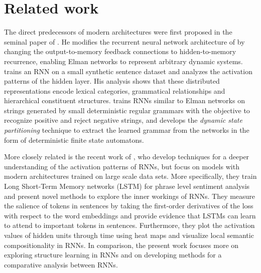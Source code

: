 \section{Related work}
\label{sec:related}

The direct predecessors of modern architectures were first proposed in the 
seminal paper of . He modifies the recurrent 
neural network architecture of  by changing the output-to-memory 
feedback connections to hidden-to-memory recurrence, enabling Elman networks to 
represent arbitrary dynamic systems.  trains an RNN on a small synthetic
sentence  dataset and analyzes the activation patterns of the hidden
layer. His analysis shows that these distributed representations  
encode lexical categories, grammatical relationships and hierarchical constituent 
structures.  trains RNNs similar to Elman
networks on strings generated by small 
deterministic regular grammars with the objective to recognize positive and reject negative 
strings, and develops the \emph{dynamic state partitioning} technique to extract the learned 
grammar from the networks in the form of deterministic finite state
automatons.

More closely related is the recent work of , who develop techniques 
for a deeper understanding of the activation patterns of RNNs, but focus on models with 
modern architectures trained on large scale data sets. More specifically, they train Long Short-Term Memory networks (LSTM) \cite{hochreiter1997long} 
for phrase level sentiment analysis 
and present novel methods 
to explore the inner workings of RNNs. They measure the salience of tokens
in sentences by taking the first-order derivatives of the loss with respect to the
word embeddings and provide evidence 
that LSTMs can learn to attend to important tokens in sentences. Furthermore,
they plot the activation values of hidden units through time using heat maps 
and visualize local semantic compositionality in RNNs. 
In comparison, the present work focuses more on exploring structure 
learning in RNNs and on developing methods for a comparative analysis between RNNs.

